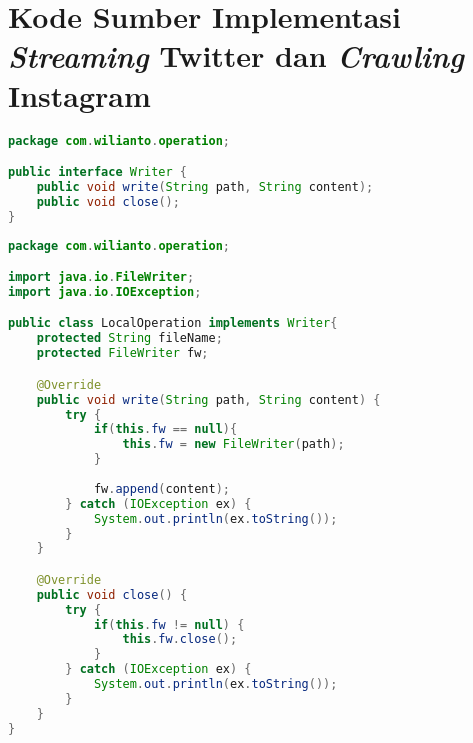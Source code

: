 \chapter{Kode Sumber Implementasi \textit{Streaming} Twitter dan \textit{Crawling} Instagram}
\label{app:E}

\singlespacing 
\begin{lstlisting}[language=Java,basicstyle=\tiny,caption=Writer.java]
package com.wilianto.operation;

public interface Writer {
    public void write(String path, String content);
    public void close();
}
\end{lstlisting}

\begin{lstlisting}[language=Java,basicstyle=\tiny,caption=LocalOperation.java]
package com.wilianto.operation;

import java.io.FileWriter;
import java.io.IOException;

public class LocalOperation implements Writer{
    protected String fileName;
    protected FileWriter fw;

    @Override
    public void write(String path, String content) {
        try {
            if(this.fw == null){
                this.fw = new FileWriter(path);
            }
            
            fw.append(content);
        } catch (IOException ex) {
            System.out.println(ex.toString());
        }
    }

    @Override
    public void close() {
        try {
            if(this.fw != null) {
                this.fw.close();
            }
        } catch (IOException ex) {
            System.out.println(ex.toString());
        }
    }
}
\end{lstlisting}

